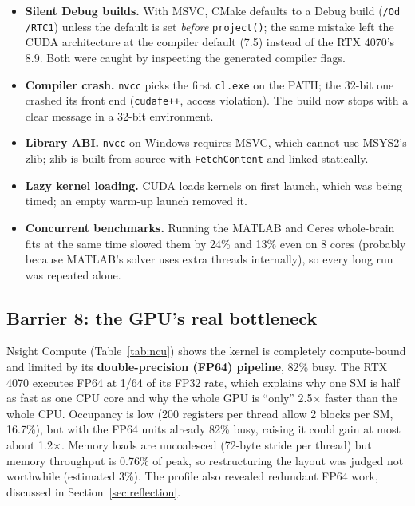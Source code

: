 \documentclass[11pt]{article}
\begin{document}
\begin{itemize}
    \item \textbf{Silent Debug builds.} With MSVC, CMake defaults to a Debug build
        (\texttt{/Od /RTC1}) unless the default is set \emph{before} \texttt{project()}; the
        same mistake left the CUDA architecture at the compiler default (7.5) instead of the
        RTX 4070's 8.9. Both were caught by inspecting the generated compiler flags.
    \item \textbf{Compiler crash.} \texttt{nvcc} picks the first \texttt{cl.exe} on the PATH; the
        32-bit one crashed its front end (\texttt{cudafe++}, access violation). The build now
        stops with a clear message in a 32-bit environment.
    \item \textbf{Library ABI.} \texttt{nvcc} on Windows requires MSVC, which cannot use MSYS2's
        zlib; zlib is built from source with \texttt{FetchContent} and linked statically.
    \item \textbf{Lazy kernel loading.} CUDA loads kernels on first launch, which was being
        timed; an empty warm-up launch removed it.
    \item \textbf{Concurrent benchmarks.} Running the MATLAB and Ceres whole-brain fits at the
        same time slowed them by 24\% and 13\% even on 8 cores (probably because MATLAB's
        solver uses extra threads internally), so every long run was repeated alone.
\end{itemize}

\subsection*{Barrier 8: the GPU's real bottleneck}

Nsight Compute (Table~\ref{tab:ncu}) shows the kernel is completely compute-bound and limited by
its \textbf{double-precision (FP64) pipeline}, 82\% busy. The RTX 4070 executes FP64 at 1/64 of
its FP32 rate, which explains why one SM is half as fast as one CPU core and why the whole GPU
is ``only'' 2.5$\times$ faster than the whole CPU. Occupancy is low (200 registers per thread
allow 2 blocks per SM, 16.7\%), but with the FP64 units already 82\% busy, raising it could gain
at most about 1.2$\times$. Memory loads are uncoalesced (72-byte stride per thread) but memory
throughput is 0.76\% of peak, so restructuring the layout was judged not worthwhile (estimated
3\%). The profile also revealed redundant FP64 work, discussed in Section~\ref{sec:reflection}.
\end{document}
